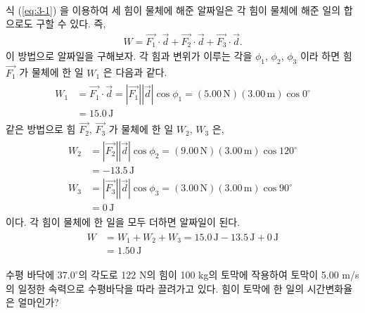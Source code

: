 \documentclass[floatfix,nofootinbib,superscriptaddress,fleqn,preprint]{revtex4}
\begin{document}
 \\
  식 (\ref{eq:3-1}) 을 이용하여 세 힘이 물체에 해준 알짜일은 각 힘이 물체에 해준 일의 
합으로도 구할 수 있다. 즉,
\begin{align}
  W = \vec{F_1}\cdot\vec{d}+\vec{F_2}\cdot\vec{d}+\vec{F_3}\cdot\vec{d}.
\end{align}
이 방법으로 알짜일을 구해보자. 각 힘과 변위가 이루는 각을 
$\phi_1$, $\phi_2$, $\phi_3$ 이라 하면
 힘 $\vec{F_1}$ 가 물체에 한 일 $W_1$ 은 다음과 같다.
\begin{align}
  \begin{split}
    W_1 &= \vec{F_1}\cdot\vec{d} = |\vec{F_1}||\vec{d}|\cos{\phi_1}
    =(5.00\,\mathrm{N})(3.00\,\mathrm{m})\cos{0^\circ}  \\
    &=15.0\,\mathrm{J}
  \end{split}
\end{align}
같은 방법으로 힘 $\vec{F_2}$, $\vec{F_3}$ 가 물체에 한 일 $W_2$, $W_3$ 은,
\begin{align}
  \begin{split}
    W_2 &= |\vec{F_2}||\vec{d}|\cos{\phi_2}
    =(9.00\,\mathrm{N})(3.00\,\mathrm{m})\cos{120^\circ}  \\
    &=-13.5\,\mathrm{J} \\
    W_3 &= |\vec{F_3}||\vec{d}|\cos{\phi_3}
    =(3.00\,\mathrm{N})(3.00\,\mathrm{m})\cos{90^\circ}  \\
    &=0\,\mathrm{J}
  \end{split}
\end{align}
이다. 각 힘이 물체에 한 일을 모두 더하면 알짜일이 된다.
\begin{align}
  \begin{split}
    W &= W_1+W_2+W_3 = 15.0\,\mathrm{J}-13.5\,\mathrm{J}+0\,\mathrm{J} \\
    &= 1.50\,\mathrm{J}
  \end{split}
  \end{align}

\vspace{1.cm}

수평 바닥에 $37.0^\circ$의 각도로 122 N의 힘이 100 kg의 토막에
작용하여 토막이 5.00 m/s의 일정한 속력으로 수평바닥을 따라 끌려가고
있다. 힘이 토막에 한 일의 시간변화율은 얼마인가?  \\
\end{document}
